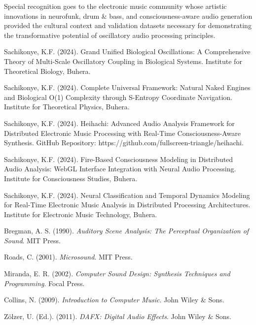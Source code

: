 \documentclass[12pt,a4paper]{article}
\begin{document}
{{{Special recognition goes to the electronic music community whose artistic innovations in neurofunk, drum & bass, and consciousness-aware audio generation provided the cultural context and validation datasets necessary for demonstrating the transformative potential of oscillatory audio processing principles.

\begin{thebibliography}{99}

Sachikonye, K.F. (2024). Grand Unified Biological Oscillations: A Comprehensive Theory of Multi-Scale Oscillatory Coupling in Biological Systems. Institute for Theoretical Biology, Buhera.

Sachikonye, K.F. (2024). Complete Universal Framework: Natural Naked Engines and Biological O(1) Complexity through S-Entropy Coordinate Navigation. Institute for Theoretical Physics, Buhera.

Sachikonye, K.F. (2024). Heihachi: Advanced Audio Analysis Framework for Distributed Electronic Music Processing with Real-Time Consciousness-Aware Synthesis. GitHub Repository: https://github.com/fullscreen-triangle/heihachi.

Sachikonye, K.F. (2024). Fire-Based Consciousness Modeling in Distributed Audio Analysis: WebGL Interface Integration with Neural Audio Processing. Institute for Consciousness Studies, Buhera.

Sachikonye, K.F. (2024). Neural Classification and Temporal Dynamics Modeling for Real-Time Electronic Music Analysis in Distributed Processing Architectures. Institute for Electronic Music Technology, Buhera.

Bregman, A. S. (1990). \textit{Auditory Scene Analysis: The Perceptual Organization of Sound}. MIT Press.

Roads, C. (2001). \textit{Microsound}. MIT Press.

Miranda, E. R. (2002). \textit{Computer Sound Design: Synthesis Techniques and Programming}. Focal Press.

Collins, N. (2009). \textit{Introduction to Computer Music}. John Wiley \& Sons.

Zölzer, U. (Ed.). (2011). \textit{DAFX: Digital Audio Effects}. John Wiley \& Sons.


\end{thebibliography}}}}
\end{document}
